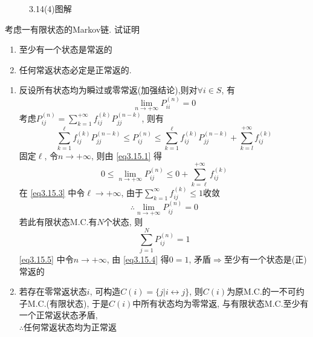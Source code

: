 \begin{solution}
\begin{enumerate}[label=(\arabic*)]
\begin{figure}[H]
			      \caption{3.14(4)图解}
		      \end{figure}
	\end{enumerate}
\end{solution}

\begin{problem}{3.15}
考虑一有限状态的Markov链. 试证明
\begin{enumerate}[label=(\alph*)]
	\item 至少有一个状态是常返的
	\item 任何常返状态必定是正常返的.
\end{enumerate}
\end{problem}
\begin{solution}[1]
	\begin{enumerate}[label=(\alph*)]
		\item 反设所有状态均为瞬过或零常返(加强结论),则对$\forall i \in S$, 有
		      \begin{equation}
			      \lim_{n\to +\infty} P^{(n)}_{ii} = 0 \label{eq3.15.1}
		      \end{equation}
		      考虑$P^{(n)}_{ij} = \sum\limits^{+\infty}_{k=1} f^{(k)}_{ij} P^{(n-k)}_{jj}$, 则有
		      \begin{equation}
			      \sum^\ell_{k=1} f^{(k)}_{ij} P^{(n-k)}_{jj} \leqslant P^{(n)}_{ij} \leqslant \sum^\ell_{k=1} f^{(k)}_{ij} P^{(n-k)}_{jj} + \sum^{+\infty}_{k=l} f^{(k)}_{ij} \label{eq3.15.2}
		      \end{equation}
		      固定$\ell$, 令$n\to +\infty$, 则由 \eqref{eq3.15.1} 得
		      \begin{equation}
			      0 \leqslant \lim_{n\to +\infty} P^{(n)}_{ij} \leqslant 0 + \sum^{+\infty}_{k=\ell} f^{(k)}_{ij} \label{eq3.15.3}
		      \end{equation}
		      在 \eqref{eq3.15.3} 中令$\ell \to +\infty$, 由于$\sum\limits^{\infty}_{k=1} f^{(k)}_{ij} \leqslant 1$收敛
		      \begin{equation}
			      \therefore \lim_{n\to +\infty} P^{(n)}_{ij} = 0 \label{eq3.15.4}
		      \end{equation}
		      若此有限状态M.C.有$N$个状态, 则
		      \begin{equation}\sum^{N}_{j=1} P^{(n)}_{ij} = 1 \label{eq3.15.5}
		      \end{equation}
		      \eqref{eq3.15.5} 中令$n\to +\infty$, 由 \eqref{eq3.15.4} 得$0=1$, 矛盾$\Rightarrow$至少有一个状态是(正)常返的
		\item 若存在零常返状态$i$, 可构造$C(i) = \{j|i\leftrightarrow j\}$,
		      则$C(i)$为原M.C.的一不可约子M.C.(有限状态),
		      于是$C(i)$中所有状态均为零常返, 与有限状态M.C.至少有一个正常返状态矛盾,\\
		      $\therefore$任何常返状态均为正常返
	\end{enumerate}
\end{solution}
